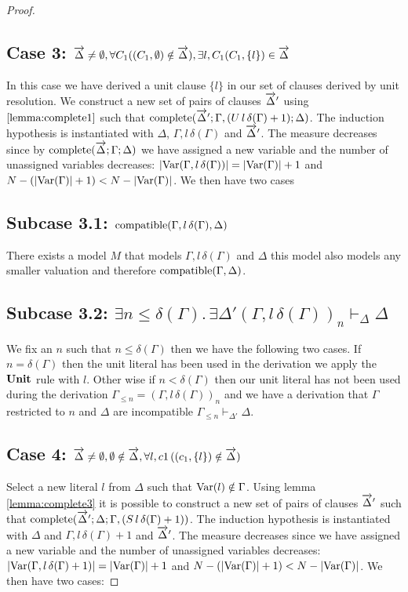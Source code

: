 \begin{mytheorem}
\begin{proof}
\subsection*{Case 3: $\overrightarrow{\Delta} \neq \emptyset, \forall C_1 ((C_1, \emptyset) \notin \overrightarrow{\Delta}), \exists l,C_1 (C_1 , \{ l \}) \in \overrightarrow{\Delta} $}
In this case we have derived a unit clause $\{ l \}$ in our set of clauses derived by unit resolution.  We construct a new set of pairs of clauses $\overrightarrow{\Delta}'$ using $\ref{lemma:complete1}$ such that $\mathrm{complete}(\overrightarrow{\Delta}';\Gamma, (U \, l \, \delta(\Gamma) + 1); \Delta)$. 
%
The induction hypothesis is instantiated with $\Delta$, $\Gamma, l \, \delta(\Gamma)$ and $\overrightarrow{\Delta}'$. The measure decreases since by $\mathrm{complete}(\overrightarrow{\Delta};\Gamma; \Delta)$ we have assigned a new variable and the number of unassigned variables decreases: $ |\mathrm{Var}(\Gamma, l \, \delta(\Gamma))| = |\mathrm{Var}(\Gamma)| + 1$ and $N - (|\mathrm{Var}(\Gamma)| + 1) <  N - |\mathrm{Var}(\Gamma)|$.   We then have two cases 
%
\subsection*{Subcase 3.1: $\mathrm{compatible}(\Gamma, l \, \delta(\Gamma),\Delta)$}
There exists a model $M$ that models $\Gamma, l \, \delta(\Gamma)$ and $\Delta$ this model also models any smaller valuation and therefore $\mathrm{compatible}(\Gamma,\Delta)$.
\subsection*{Subcase 3.2: $\exists n \leq \delta(\Gamma). \, \exists \Delta' (\Gamma, l \, \delta(\Gamma))_n \vdash_{\Delta} \Delta$}
We fix an $n$ such that $n \leq \delta(\Gamma)$ then we have the following two cases. If $n = \delta(\Gamma)$ then the unit literal has been used in the derivation we apply the $\mathbf{Unit}$ rule with $l$. Other wise if $n < \delta(\Gamma)$ 
then our unit literal has not been used during the derivation $\Gamma_{\leq n} = (\Gamma, l \, \delta(\Gamma))_n$ and we have a derivation that $\Gamma$ restricted to $n$ and $\Delta$ are incompatible $\Gamma_{\leq n} \vdash_{\Delta'} \Delta$.
%
\subsection*{Case 4: $\overrightarrow{\Delta} \neq \emptyset, \emptyset \notin \overrightarrow{\Delta},  \forall l,c1 \, ( (c_1 , \{ l \})  \notin \overrightarrow{\Delta} )$}
Select a new literal $l$ from $\Delta$ such that $\mathrm{Var}(l) \notin \Gamma$. Using lemma \ref{lemma:complete3} it is possible to construct a new set of pairs of clauses $\overrightarrow{\Delta}'$ such that $\mathrm{complete}(\overrightarrow{\Delta}';\Delta; \Gamma, (S \, l \, \delta(\Gamma) + 1))$.
The induction hypothesis is instantiated with $\Delta$ and $ \Gamma, l \, \delta(\Gamma) + 1$ and $\overrightarrow{\Delta}'$. The measure decreases since we have assigned a new variable and the number of unassigned variables decreases: $ |\mathrm{Var}(\Gamma, l \, \delta(\Gamma) + 1)| = |\mathrm{Var}(\Gamma)| + 1$ and $N - (|\mathrm{Var}(\Gamma)| + 1) <  N - |\mathrm{Var}(\Gamma)|$.  We then have two cases:
%

\end{proof}
\end{mytheorem}
